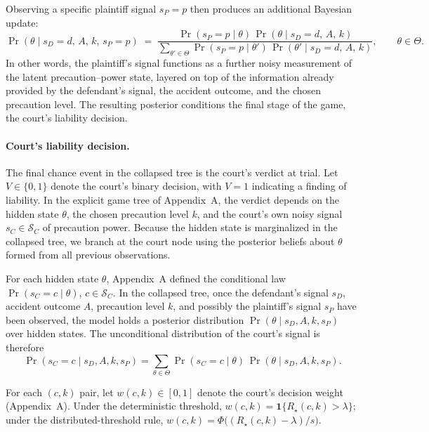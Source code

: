 \documentclass{article}
\begin{document}
Observing a specific plaintiff signal $s_P=p$ then produces an additional Bayesian update:
\[
\Pr(\theta \mid s_D=d,\,A,\,k,\,s_P=p)
\;=\;
\frac{\Pr(s_P=p \mid \theta)\,\Pr(\theta \mid s_D=d,\,A,\,k)}
{\sum_{\theta'\in\Theta} \Pr(s_P=p \mid \theta')\,\Pr(\theta' \mid s_D=d,\,A,\,k)},
\qquad \theta\in\Theta.
\]
In other words, the plaintiff’s signal functions as a further noisy measurement of the latent precaution–power state, layered on top of the information already provided by the defendant’s signal, the accident outcome, and the chosen precaution level. The resulting posterior conditions the final stage of the game, the court’s liability decision.

\paragraph{Court’s liability decision.} The final chance event in the collapsed tree is the court’s verdict at trial. Let $V\in\{0,1\}$ denote the court’s binary decision, with $V=1$ indicating a finding of liability. In the explicit game tree of Appendix~A, the verdict depends on the hidden state $\theta$, the chosen precaution level $k$, and the court’s own noisy signal $s_C\in\mathcal{S}_C$ of precaution power. Because the hidden state is marginalized in the collapsed tree, we branch at the court node using the posterior beliefs about $\theta$ formed from all previous observations.

For each hidden state $\theta$, Appendix~A defined the conditional law $\Pr(s_C=c\mid \theta)$, $c\in\mathcal{S}_C$. In the collapsed tree, once the defendant’s signal $s_D$, accident outcome $A$, precaution level $k$, and possibly the plaintiff’s signal $s_P$ have been observed, the model holds a posterior distribution $\Pr(\theta \mid s_D, A, k, s_P)$ over hidden states. The unconditional distribution of the court’s signal is therefore
\[
\Pr(s_C=c \mid s_D, A, k, s_P)
= \sum_{\theta\in\Theta} \Pr(s_C=c\mid \theta)\,\Pr(\theta \mid s_D, A, k, s_P).
\]

For each $(c,k)$ pair, let $w(c,k)\in[0,1]$ denote the court’s decision weight (Appendix~A). Under the deterministic threshold, $w(c,k)=\mathbf{1}\{R_\star(c,k)>\lambda\}$; under the distributed-threshold rule, $w(c,k)=\Phi\!\bigl((R_\star(c,k)-\lambda)/s\bigr)$.
\end{document}
